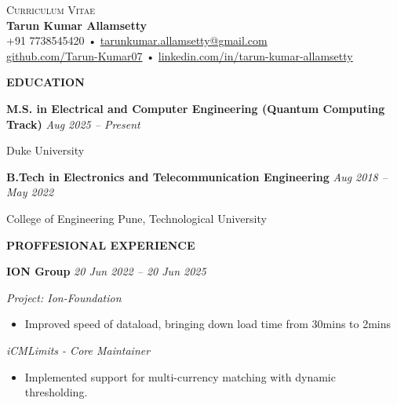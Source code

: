 \documentclass[letterpaper,10pt]{article}
\newcommand{\cvHeaderOne}[1]{%
  \vspace*{1.2em}%
  {\noindent\large\textbf{\MakeUppercase{#1}}\par}%
  \vspace*{0.5em}%
}
\newcommand{\cvHeaderTwo}[2]{%
  \vspace{0.8em}%
  \noindent\textbf{\normalsize #1} \hfill \textit{#2}\par%
}
\newcommand{\cvHeaderThree}[1]{%
  \noindent\textit{#1}%
}
\newcommand{\cvItem}[1]{%
  \noindent\parbox{\dimexpr\linewidth}{#1}\par%
}
\newenvironment{cvItemList}{%
  \begin{itemize}%
    \setlength{\itemsep}{0.1em}%
    \setlength{\topsep}{0em}%
    \setlength{\partopsep}{0em}%
    \setlength{\parsep}{0em}%
    \setlength{\parskip}{0em}%
}{%
  \end{itemize}%
}
\begin{document}
\begin{center}
  {\large \textsc{Curriculum Vitae}} \\[0.3em]
  {\LARGE \textbf{Tarun Kumar Allamsetty}} \\[0.75em]
  \small
  +91 7738545420 \quad • \quad \href{mailto:tarunkumar.allamsetty@gmail.com}{tarunkumar.allamsetty@gmail.com} \\[0.2em]
  \href{https://github.com/Tarun-Kumar07}{github.com/Tarun-Kumar07} \quad • \quad
  \href{https://www.linkedin.com/in/tarun-kumar-allamsetty}{linkedin.com/in/tarun-kumar-allamsetty}
\end{center}

\vspace{2em}

\cvHeaderOne{Education}

\cvHeaderTwo{M.S. in Electrical and Computer Engineering (Quantum Computing Track)}{Aug 2025 -- Present}
\cvItem{Duke University}

\cvHeaderTwo{B.Tech in Electronics and Telecommunication Engineering}{Aug 2018 -- May 2022}
\cvItem{College of Engineering Pune, Technological University}

\cvHeaderOne{Proffesional Experience}

\cvHeaderTwo{ION Group}{20 Jun 2022 -- 20 Jun 2025}

\cvHeaderThree{Project: Ion-Foundation}

\begin{cvItemList}
  \item Improved speed of dataload, bringing down load time from 30mins to 2mins  
\end{cvItemList}

\cvHeaderThree{iCMLimits - Core Maintainer}
\begin{cvItemList}
  \item Implemented support for multi-currency matching with dynamic thresholding.
\end{cvItemList}
\end{document}
